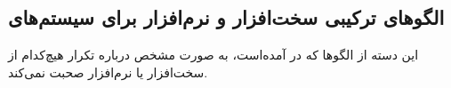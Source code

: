 \subsection{الگوهای ترکیبی سخت‌افزار و نرم‌افزار برای سیستم‌های }
\begin{RTL}
این دسته از الگوها که در \cite{ref5} آمده‌است، به صورت مشخص درباره
تکرار هیچ‌کدام از سخت‌افزار یا نرم‌افزار صحبت نمی‌کند.
\end{RTL}

